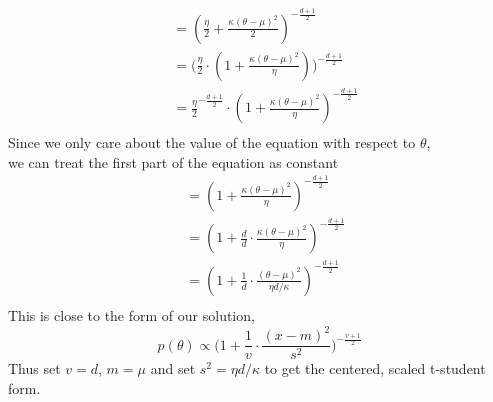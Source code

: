 \documentclass{homework}
\begin{document}
\begin{enumerate}[label=(\Alph*)]
\begin{equation}
\begin{split}
& = ( \frac{\eta}{2} + \frac{\kappa(\theta - \mu)^2}{2} )^{-\frac{d+1}{2}} \\
& = \big(\frac{\eta}{2} \cdot ( 1 + \frac{\kappa(\theta - \mu)^2}{\eta}) \big)^{-\frac{d+1}{2}} \\
& = \frac{\eta}{2}^{-\frac{d+1}{2}} \cdot ( 1 + \frac{\kappa(\theta - \mu)^2}{\eta})^{-\frac{d+1}{2}} \\
\end{split} \end{equation}
Since we only care about the value of the equation with respect to $\theta$, \\we can treat the first part of the equation as constant
\begin{equation} \begin{split}
& = ( 1 + \frac{\kappa(\theta - \mu)^2}{\eta})^{-\frac{d+1}{2}} \\
& = ( 1 + \frac{d}{d} \cdot \frac{\kappa(\theta - \mu)^2}{\eta})^{-\frac{d+1}{2}} \\
& = ( 1 + \frac{1}{d} \cdot \frac{(\theta - \mu)^2}{\eta d/\kappa})^{-\frac{d+1}{2}} \\
\end{split} \end{equation}
This is close to the form of our solution, $$p(\theta) \propto \big( 1 + \frac{1}{v} \cdot \frac{(x-m)^2}{s^2}\big)^{-\frac{v+1}{2}}$$
Thus set $v = d$, $m = \mu$ and set $s^2 = \eta d/\kappa$ to get the centered, scaled t-student form.


\end{enumerate}
\end{document}
